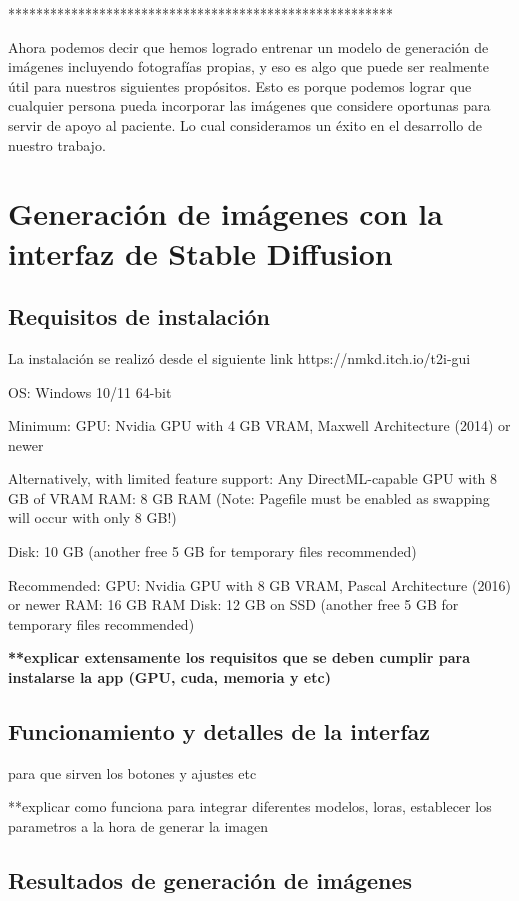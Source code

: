 *******************************************************


Ahora podemos decir que hemos logrado entrenar un modelo de generación de imágenes incluyendo fotografías propias, y eso es algo que puede ser realmente útil para nuestros siguientes propósitos. Esto es porque podemos lograr que cualquier persona pueda incorporar las imágenes que considere oportunas para servir de apoyo al paciente. Lo cual consideramos un éxito en el desarrollo de nuestro trabajo. 


\section{Generación de imágenes con la interfaz de Stable Diffusion}

\subsection{Requisitos de instalación}

La instalación se realizó desde el siguiente link 
https://nmkd.itch.io/t2i-gui

OS: Windows 10/11 64-bit

Minimum:
GPU: Nvidia GPU with 4 GB VRAM, Maxwell Architecture (2014) or newer

Alternatively, with limited feature support: Any DirectML-capable GPU with 8 GB of VRAM
RAM: 8 GB RAM (Note: Pagefile must be enabled as swapping will occur with only 8 GB!)

Disk: 10 GB (another free 5 GB for temporary files recommended)

Recommended:
GPU: Nvidia GPU with 8 GB VRAM, Pascal Architecture (2016) or newer
RAM: 16 GB RAM
Disk: 12 GB on SSD (another free 5 GB for temporary files recommended)

\textbf{**explicar extensamente los requisitos que se deben cumplir para instalarse la app (GPU, cuda, memoria y etc)}

\subsection{Funcionamiento y detalles de la interfaz}

 
para que sirven los botones y ajustes etc

**explicar como funciona para integrar diferentes modelos, loras, establecer los parametros a la hora de generar la imagen

\subsection{Resultados de generación de imágenes}



